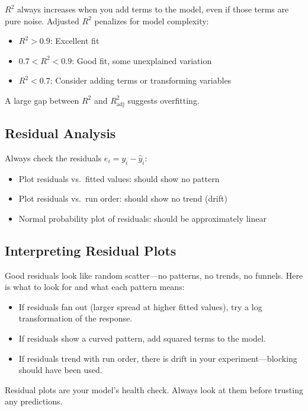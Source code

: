 \documentclass[11pt]{book}
\begin{document}
$R^2$ always increases when you add terms to the model, even if those terms are
pure noise. Adjusted $R^2$ penalizes for model complexity:

\begin{itemize}[nosep]
\item $R^2 > 0.9$: Excellent fit
\item $0.7 < R^2 < 0.9$: Good fit, some unexplained variation
\item $R^2 < 0.7$: Consider adding terms or transforming variables
\end{itemize}

A large gap between $R^2$ and $R^2_{\text{adj}}$ suggests overfitting.

\subsection{Residual Analysis}

Always check the residuals $e_i = y_i - \hat{y}_i$:
\begin{itemize}[nosep]
\item Plot residuals vs.\ fitted values: should show no pattern
\item Plot residuals vs.\ run order: should show no trend (drift)
\item Normal probability plot of residuals: should be approximately linear
\end{itemize}

\subsection{Interpreting Residual Plots}

Good residuals look like random scatter---no patterns, no trends, no funnels.
Here is what to look for and what each pattern means:

\begin{itemize}[nosep]
\item If residuals fan out (larger spread at higher fitted values), try a log
      transformation of the response.
\item If residuals show a curved pattern, add squared terms to the model.
\item If residuals trend with run order, there is drift in your experiment---blocking
      should have been used.
\end{itemize}

\begin{keypoint}
Residual plots are your model's health check. Always look at them before
trusting any predictions.
\end{keypoint}
\end{document}
